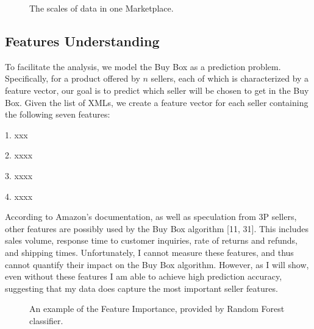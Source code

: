 \begin{figure}[!h]
	\begin{center}
	\end{center}
	\caption{\label{fig:scale}The scales of data in one Marketplace.}
\end{figure}

\subsection{Features Understanding}
\label{sec:featureunderstanding}



To facilitate the analysis, we model the Buy Box as a prediction problem. Specifically, for a product offered by $n$ sellers, each of which is characterized by a feature vector, our goal is to predict which seller will be chosen to get in the Buy Box. Given the list of XMLs, we create a feature vector for each seller containing the following seven features:

1. xxx

2. xxxx

3. xxxx

4. xxxx

According to Amazon’s documentation, as well as speculation from 3P sellers, other
features are possibly used by the Buy Box algorithm [11, 31]. This includes sales volume, response time to customer inquiries, rate of returns and refunds, and shipping times. Unfortunately, I cannot measure these features, and thus cannot quantify their impact on the Buy Box algorithm. However, as I will show, even without these features I am able to achieve high prediction accuracy, suggesting that my data does capture the most important seller features.

\begin{figure}[!h]
	\begin{center}
	\end{center}
	\caption{\label{fig:fi}An example of the Feature Importance, provided by Random Forest classifier.}
\end{figure}
